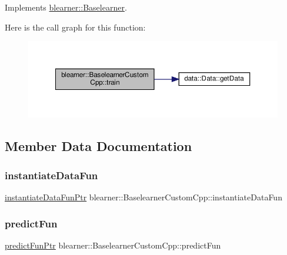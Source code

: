 Implements \hyperlink{classblearner_1_1_baselearner_a40e03ad070b9a03aae706d9ee8094b80}{blearner\+::\+Baselearner}.

Here is the call graph for this function\+:
\nopagebreak
\begin{figure}[H]
\begin{center}
\leavevmode
\includegraphics[width=350pt]{classblearner_1_1_baselearner_custom_cpp_a7437b1175498b928d3202b586527d2c4_cgraph}
\end{center}
\end{figure}


\subsection{Member Data Documentation}
\mbox{\label{classblearner_1_1_baselearner_custom_cpp_ab8d8e9a2bc502286ad1cd1ea5e646270}} 
\subsubsection{\texorpdfstring{instantiate\+Data\+Fun}{instantiateDataFun}}
{\footnotesize\ttfamily \hyperlink{namespaceblearner_a10cec16134a934fb9defbdc2c2011f2a}{instantiate\+Data\+Fun\+Ptr} blearner\+::\+Baselearner\+Custom\+Cpp\+::instantiate\+Data\+Fun\hspace{0.3cm}{\ttfamily [private]}}

\mbox{\label{classblearner_1_1_baselearner_custom_cpp_aa5f2ac8345bddaf143d47d7c88e993c5}} 
\subsubsection{\texorpdfstring{predict\+Fun}{predictFun}}
{\footnotesize\ttfamily \hyperlink{namespaceblearner_a93d5b51440d434704d2bde9dee652f6e}{predict\+Fun\+Ptr} blearner\+::\+Baselearner\+Custom\+Cpp\+::predict\+Fun\hspace{0.3cm}{\ttfamily [private]}}

